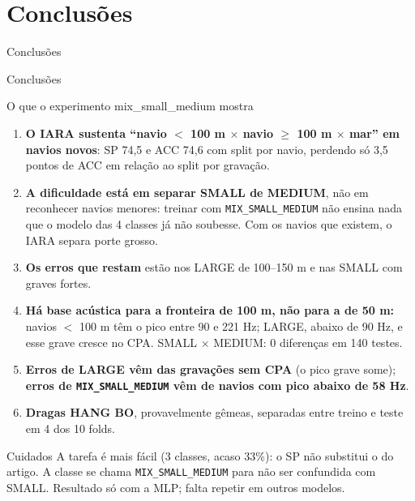 \documentclass[aspectratio=169]{beamer}
\newcommand{\mix}{\texttt{MIX\_SMALL\_MEDIUM}}
\begin{document}
\section{Conclusões}

\begin{frame}
    \centering
    \huge Conclusões
\end{frame}

\begin{frame}{Conclusões}
    \footnotesize
    \begin{block}{\small O que o experimento mix\_small\_medium mostra}
        \scriptsize
        \begin{enumerate}
            \setlength{\itemsep}{0.5pt}
            \item \textbf{O IARA sustenta ``navio $<$ 100 m $\times$ navio $\geq$ 100 m $\times$ mar'' em navios novos}: SP 74,5 e ACC 74,6 com split por navio, perdendo só 3,5 pontos de ACC em relação ao split por gravação.
            \item \textbf{A dificuldade está em separar SMALL de MEDIUM}, não em reconhecer navios menores: treinar com \mix{} não ensina nada que o modelo das 4 classes já não soubesse. Com os navios que existem, o IARA separa porte grosso.
            \item \textbf{Os erros que restam} estão nos LARGE de 100--150 m e nas SMALL com graves fortes.
            \item \textbf{Há base acústica para a fronteira de 100 m, não para a de 50 m:} navios $<$ 100 m têm o pico entre 90 e 221 Hz; LARGE, abaixo de 90 Hz, e esse grave cresce no CPA. SMALL $\times$ MEDIUM: 0 diferenças em 140 testes.
            \item \textbf{Erros de LARGE vêm das gravações sem CPA} (o pico grave some); \textbf{erros de \mix{} vêm de navios com pico abaixo de 58 Hz}.
            \item \textbf{Dragas HANG BO}, provavelmente gêmeas, separadas entre treino e teste em 4 dos 10 folds.
        \end{enumerate}
    \end{block}
    \begin{alertblock}{\small Cuidados}
        \scriptsize
        A tarefa é mais fácil (3 classes, acaso 33\%): o SP não substitui o do artigo. A classe se chama \mix{} para não ser confundida com SMALL. Resultado só com a MLP; falta repetir em outros modelos.
    \end{alertblock}
\end{frame}
\end{document}
